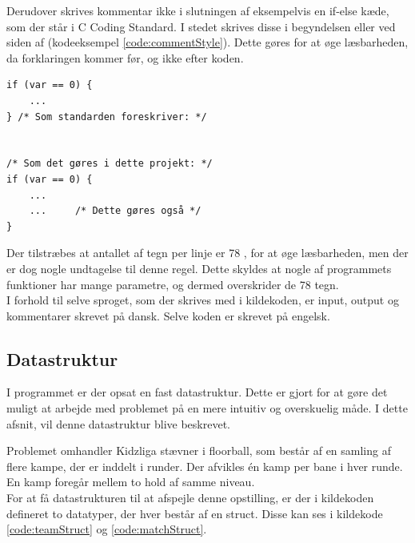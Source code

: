 Derudover skrives kommentar ikke i slutningen af eksempelvis en if-else kæde, som der står i C Coding Standard. I stedet skrives disse i begyndelsen eller ved siden af (kodeeksempel \ref{code:commentStyle}). Dette gøres for at øge læsbarheden, da forklaringen kommer før, og ikke efter koden.

\begin{listing}[H]
\begin{verbatim}
if (var == 0) {
    ...
} /* Som standarden foreskriver: */


/* Som det gøres i dette projekt: */
if (var == 0) {
    ...
    ...     /* Dette gøres også */
}
\end{verbatim}
\label{code:commentStyle}
\end{listing}

Der tilstræbes at antallet af tegn per linje er 78 \cite{codingstyle}, for at øge læsbarheden, men der er dog nogle undtagelse til denne regel. Dette skyldes at nogle af programmets funktioner har mange parametre, og dermed overskrider de 78 tegn.\\
I forhold til selve sproget, som der skrives med i kildekoden, er input, output og kommentarer skrevet på dansk. Selve koden er skrevet på engelsk.

\subsection*{Datastruktur}
I programmet er der opsat en fast datastruktur. Dette er gjort for at gøre det muligt at arbejde med problemet på en mere intuitiv og overskuelig måde. I dette afsnit, vil denne datastruktur blive beskrevet.
\par
Problemet omhandler Kidzliga stævner i floorball, som består af en samling af flere kampe, der er inddelt i runder. Der afvikles én kamp per bane i hver runde. En kamp foregår mellem to hold af samme niveau.\\
For at få datastrukturen til at afspejle denne opstilling, er der i kildekoden defineret to datatyper, der hver består af en struct. Disse kan ses i kildekode \ref{code:teamStruct} og \ref{code:matchStruct}.

